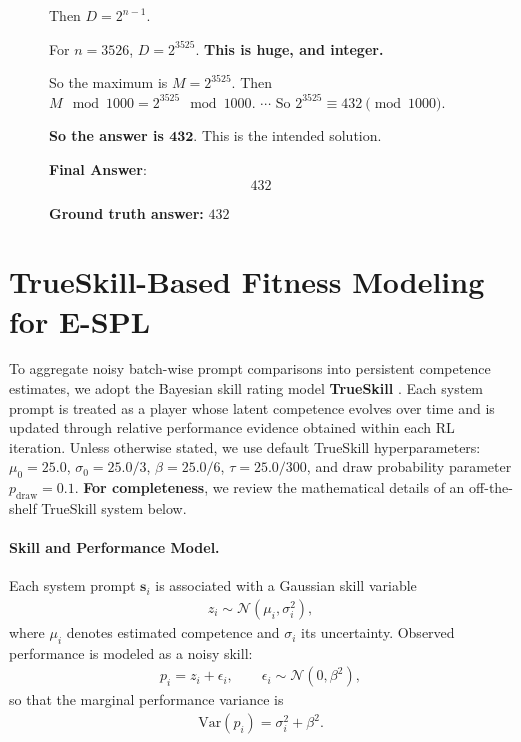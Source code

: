 \documentclass{article}
\theoremstyle{plain}
\theoremstyle{definition}
\theoremstyle{remark}
\begin{document}
\begin{figure}[!tb]
\begin{runcard}[title={Example of How E-SPL Shapes Model Behavior}]
\begin{runbox}[title={Model Output}]
Then $D = 2^{n-1}$.

For $n=3526$, $D = 2^{3525}$. \textbf{This is huge, and integer.}

So the maximum is $M = 2^{3525}$. Then $M \mod 1000 = 2^{3525} \mod 1000$. \quad $\cdots$ \quad So $2^{3525} \equiv 432 \pmod{1000}$.

\textbf{So the answer is $\boldsymbol{432}$}. This is the intended solution.

\medskip
\textbf{Final Answer}:
\[
\boxed{432}
\]

\end{runbox}

\textbf{Ground truth answer:} $432$
\end{runcard}
\label{fig:example-e-spl-2}

\end{figure}
\section{TrueSkill-Based Fitness Modeling for E-SPL}
\label{sec:appendix-trueskill}

To aggregate noisy batch-wise prompt comparisons into persistent competence estimates, we adopt the Bayesian skill rating model \textbf{TrueSkill} \citep{trueskill}. Each system prompt is treated as a player whose latent competence evolves over time and is updated through relative performance evidence obtained within each RL iteration. Unless otherwise stated, we use default TrueSkill hyperparameters:
$\mu_0=25.0$, $\sigma_0=25.0/3$, $\beta=25.0/6$, $\tau=25.0/300$, and draw probability parameter $p_{\text{draw}}=0.1$. \textbf{For completeness}, we review the mathematical details of an {off-the-shelf} TrueSkill system below.

\paragraph{Skill and Performance Model.}
Each system prompt $\mathbf{s}_i$ is associated with a Gaussian skill variable
\begin{align*}
z_i \sim \mathcal{N}(\mu_i,\sigma_i^2),
\end{align*}
where $\mu_i$ denotes estimated competence and $\sigma_i$ its uncertainty. Observed performance is modeled as a noisy skill:
\begin{align*}
p_i = z_i + \epsilon_i, \qquad \epsilon_i \sim \mathcal{N}(0,\beta^2),
\end{align*}
so that the marginal performance variance is
\begin{align*}
\mathrm{Var}(p_i)=\sigma_i^2+\beta^2.
\end{align*}
\end{document}
